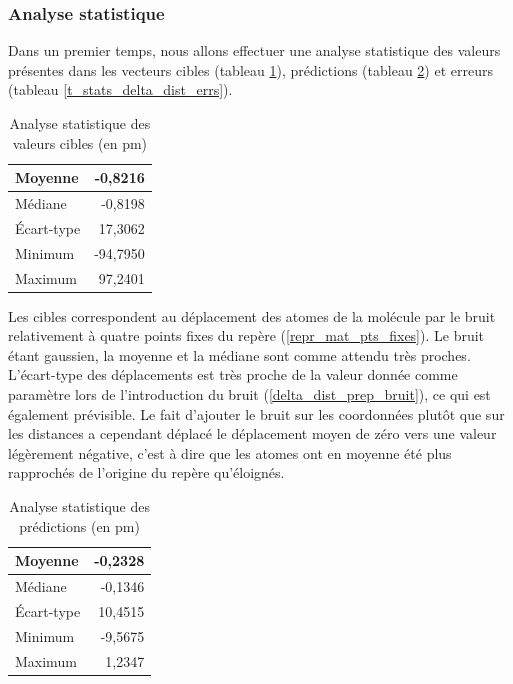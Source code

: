 \subsubsection{Analyse statistique}

\par Dans un premier temps, nous allons effectuer une analyse statistique des valeurs présentes dans les vecteurs cibles (tableau \ref{t_stats_delta_dist_cibles}), prédictions (tableau \ref{t_stats_delta_dist_preds}) et erreurs (tableau \ref{t_stats_delta_dist_errs}). \\


\begin{table}
	\centering
	\begin{tabular}{|l|r|}
		\hline
		Moyenne & -0,8216 \\ \hline
		Médiane & -0,8198 \\ \hline
		Écart-type & 17,3062 \\ \hline
		Minimum & -94,7950 \\ \hline
		Maximum & 97,2401 \\ \hline
	\end{tabular}
	
	\caption{Analyse statistique des valeurs cibles (en pm)}
	\label{t_stats_delta_dist_cibles}
\end{table}

\par Les cibles correspondent au déplacement des atomes de la molécule par le bruit relativement à quatre points fixes du repère (\ref{repr_mat_pts_fixes}). Le bruit étant gaussien, la moyenne et la médiane sont comme attendu très proches. L'écart-type des déplacements est très proche de la valeur donnée comme paramètre lors de l'introduction du bruit (\ref{delta_dist_prep_bruit}), ce qui est également prévisible. Le fait d'ajouter le bruit sur les coordonnées plutôt que sur les distances a cependant déplacé le déplacement moyen de zéro vers une valeur légèrement négative, c'est à dire que les atomes ont en moyenne été plus rapprochés de l'origine du repère qu'éloignés.\\


\begin{table}
	\centering
	\begin{tabular}{|l|r|}
		\hline
		Moyenne & -0,2328 \\ \hline
		Médiane & -0,1346 \\ \hline
		Écart-type & 10,4515 \\ \hline
		Minimum & -9,5675 \\ \hline
		Maximum & 1,2347 \\ \hline
	\end{tabular}
	
	\caption{Analyse statistique des prédictions (en pm)}
	\label{t_stats_delta_dist_preds}
\end{table}

